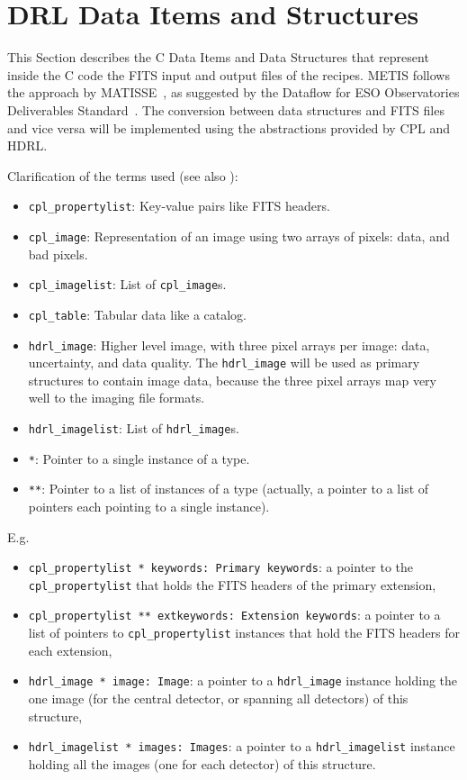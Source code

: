 \clearpage
\section{DRL Data Items and Structures}\label{sec:drl_data_structures}


This Section describes the C Data Items and Data Structures that represent inside the C code the FITS input and output files of the recipes. \ac{METIS} follows the approach by MATISSE~\cite{MATISSE-DRLD}, as suggested by the Dataflow for ESO Observatories Deliverables Standard~\cite{1618}.
The conversion between data structures and \ac{FITS} files and vice versa will be implemented using the abstractions provided by \ac{CPL} and \ac{HDRL}. 

Clarification of the terms used (see also \cite{hdrl-manual}):
\begin{itemize}
    \item \texttt{cpl\_propertylist}: Key-value pairs like \ac{FITS} headers.
    \item \texttt{cpl\_image}: Representation of an image using two arrays of pixels: data, and bad pixels.
    \item \texttt{cpl\_imagelist}: List of \texttt{cpl\_image}s.
    \item \texttt{cpl\_table}: Tabular data like a catalog.
    \item \texttt{hdrl\_image}: Higher level image, with three pixel arrays per image: data, uncertainty, and data quality.
          The \texttt{hdrl\_image} will be used as primary structures to contain image data, because the three pixel arrays map very well to the imaging file formats.
    \item \texttt{hdrl\_imagelist}: List of \texttt{hdrl\_image}s.
    \item \texttt{*}: Pointer to a single instance of a type.
    \item \texttt{**}: Pointer to a list of instances of a type (actually, a pointer to a list of pointers each pointing to a single instance).
\end{itemize}

E.g.
\begin{itemize}
    \item \texttt{cpl\_propertylist * keywords: Primary keywords}: a pointer to the \texttt{cpl\_propertylist} that holds the \ac{FITS} headers of the primary extension,
    \item \texttt{cpl\_propertylist ** extkeywords: Extension keywords}: a pointer to a list of pointers to \texttt{cpl\_propertylist} instances that hold the \ac{FITS} headers for each extension,
    \item \texttt{hdrl\_image * image: Image}: a pointer to a \texttt{hdrl\_image} instance holding the one image (for the central detector, or spanning all detectors) of this structure,
    \item \texttt{hdrl\_imagelist * images: Images}: a pointer to a \texttt{hdrl\_imagelist} instance holding all the images (one for each detector) of this structure.
\end{itemize}


